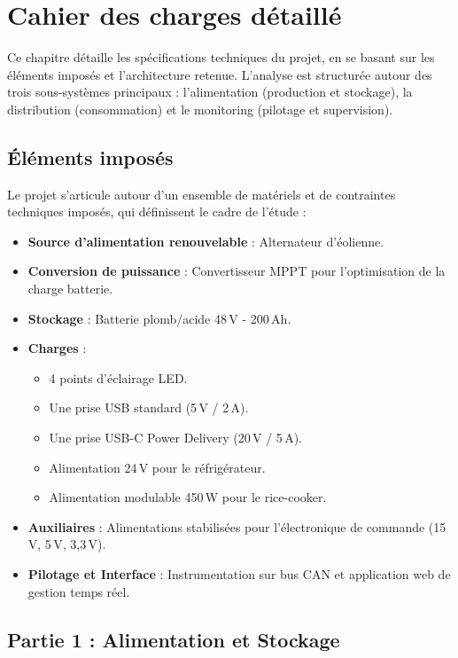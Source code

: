 \chapter{Cahier des charges détaillé}
\label{chap:cdc_detaille}

Ce chapitre détaille les spécifications techniques du projet, en se basant sur les éléments imposés et l'architecture retenue. L'analyse est structurée autour des trois sous-systèmes principaux : l'alimentation (production et stockage), la distribution (consommation) et le monitoring (pilotage et supervision).

\section{Éléments imposés}

Le projet s'articule autour d'un ensemble de matériels et de contraintes techniques imposés, qui définissent le cadre de l'étude :

\begin{itemize}
    \item \textbf{Source d'alimentation renouvelable} : Alternateur d’éolienne.
    \item \textbf{Conversion de puissance} : Convertisseur MPPT pour l'optimisation de la charge batterie.
    \item \textbf{Stockage} : Batterie plomb/acide 48\,V - 200\,Ah.
    \item \textbf{Charges} :
    \begin{itemize}
        \item 4 points d’éclairage LED.
        \item Une prise USB standard (5\,V / 2\,A).
        \item Une prise USB-C Power Delivery (20\,V / 5\,A).
        \item Alimentation 24\,V pour le réfrigérateur.
        \item Alimentation modulable 450\,W pour le rice-cooker.
    \end{itemize}
    \item \textbf{Auxiliaires} : Alimentations stabilisées pour l'électronique de commande (15\,V, 5\,V, 3,3\,V).
    \item \textbf{Pilotage et Interface} : Instrumentation sur bus CAN et application web de gestion temps réel.
\end{itemize}

\section{Partie 1 : Alimentation et Stockage}

